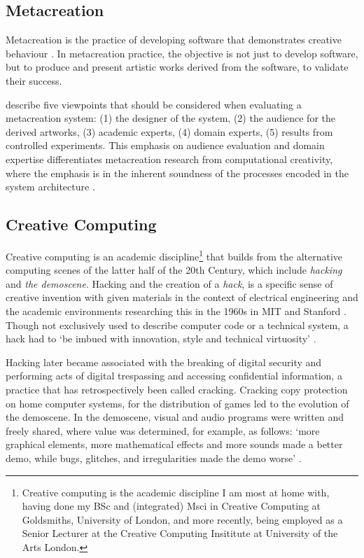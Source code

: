 \subsection{Metacreation}

Metacreation is the practice of developing software that demonstrates creative behaviour \citep{whitelaw2004metacreation}. 
In metacreation practice, the objective is not just to develop software, but to produce and present artistic works derived from the software, to validate their success. 

\cite{eigenfeldt2012evaluating} describe five viewpoints that should be considered when evaluating a metacreation system: (1) the designer of the system, (2) the audience for the derived artworks, (3) academic experts, (4) domain experts, (5) results from controlled experiments.
This emphasis on audience evaluation and domain expertise differentiates metacreation research from computational creativity, where the emphasis is in the inherent soundness of the processes encoded in the system architecture \citep{colton2008creativity}.

\subsection{Creative Computing}

Creative computing is an academic discipline\footnote{Creative computing is the academic discipline I am most at home with, having done my BSc and (integrated) Msci in Creative Computing at Goldsmiths, University of London, and more recently, being employed as a Senior Lecturer at the Creative Computing Insititute at University of the Arts London.}
that builds from the alternative computing scenes of the latter half of the 20th Century, which include \textit{hacking} and \textit{the demoscene}. 
Hacking and the creation of a \textit{hack}, is a specific sense of creative invention with given materials in the context of electrical engineering and the academic environments researching this in the 1960s in MIT and Stanford \citep{wark2006hackers}. 
Though not exclusively used to describe computer code or a technical system, a hack had to `be imbued with innovation, style and technical virtuosity' \citep{levy1984hackers}.

Hacking later became associated with the breaking of digital security and performing acts of digital trespassing and accessing confidential information, a practice that has retrospectively been called cracking. 
Cracking copy protection on home computer systems, for the distribution of games led to the evolution of the demoscene. 
 In the demoscene, visual and audio programs were written and freely shared, where value was determined, for example, as follows: ‘more graphical elements, more mathematical effects and more sounds made a better demo, while bugs, glitches, and irregularities made the demo worse’ \citep{carlsson2019forgotten}.

